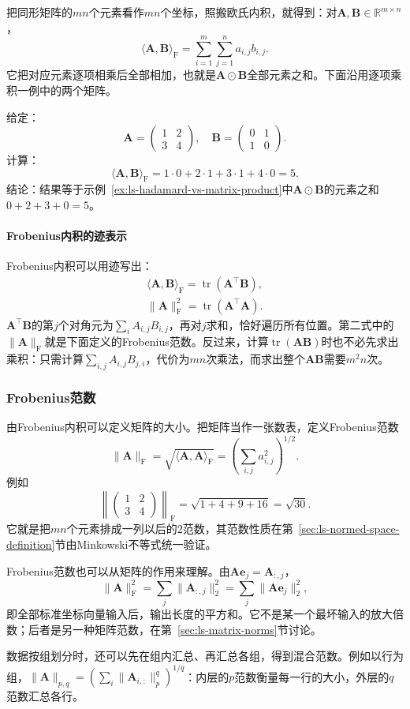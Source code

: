把同形矩阵的$mn$个元素看作$mn$个坐标，照搬欧氏内积，就得到：对$\bm A,\bm B\in\mathbb R^{m\times n}$，
\[
 \langle\bm A,\bm B\rangle_{\mathrm F}=\sum_{i=1}^m\sum_{j=1}^na_{i,j}b_{i,j}.
\]
它把对应元素逐项相乘后全部相加，也就是$\bm A\odot\bm B$全部元素之和。下面沿用逐项乘积一例中的两个矩阵。
\begin{example}[Frobenius内积的计算]
\label{ex:ls-frobenius-inner-product}
给定：
\[
 \bm A=\begin{pmatrix}1&2\\3&4\end{pmatrix},\quad
 \bm B=\begin{pmatrix}0&1\\1&0\end{pmatrix}.
\]
计算：
\[
 \langle\bm A,\bm B\rangle_{\mathrm F}=1\cdot0+2\cdot1+3\cdot1+4\cdot0=5.
\]
结论：结果等于示例~\ref{ex:ls-hadamard-vs-matrix-product}中$\bm A\odot\bm B$的元素之和$0+2+3+0=5$。
\end{example}

\paragraph{Frobenius内积的迹表示}
Frobenius内积可以用迹写出：
\[
 \begin{gathered}
 \langle\bm A,\bm B\rangle_{\mathrm F}=\operatorname{tr}(\bm A^\top\bm B),\\
 \lVert\bm A\rVert_{\mathrm F}^2=\operatorname{tr}(\bm A^\top\bm A).
 \end{gathered}
\]
$\bm A^\top\bm B$的第$j$个对角元为$\sum_i A_{i,j}B_{i,j}$，再对$j$求和，恰好遍历所有位置。第二式中的$\lVert\bm A\rVert_{\mathrm F}$就是下面定义的Frobenius范数。反过来，计算$\operatorname{tr}(\bm A\bm B)$时也不必先求出乘积：只需计算$\sum_{i,j}A_{i,j}B_{j,i}$，代价为$mn$次乘法，而求出整个$\bm A\bm B$需要$m^2n$次。

\subsubsection{Frobenius范数}
\label{sec:ls-frobenius-norm}

由Frobenius内积可以定义矩阵的大小。把矩阵当作一张数表，定义Frobenius范数
\[
 \lVert\bm A\rVert_{\mathrm F}=\sqrt{\langle\bm A,\bm A\rangle_{\mathrm F}}=\left(\sum_{i,j}a_{i,j}^2\right)^{1/2}.
\]
例如
\[
 \left\lVert\begin{pmatrix}1&2\\3&4\end{pmatrix}\right\rVert_{\mathrm F}=\sqrt{1+4+9+16}=\sqrt{30}.
\]
它就是把$mn$个元素排成一列以后的$2$范数，其范数性质在第~\ref{sec:ls-normed-space-definition}节由Minkowski不等式统一验证。

Frobenius范数也可以从矩阵的作用来理解。由$\bm A\bm e_j=\bm A_{:,j}$，
\[
 \lVert\bm A\rVert_{\mathrm F}^2=\sum_j\lVert\bm A_{:,j}\rVert_2^2=\sum_j\lVert\bm A\bm e_j\rVert_2^2,
\]
即全部标准坐标向量输入后，输出长度的平方和。它不是某一个最坏输入的放大倍数；后者是另一种矩阵范数，在第~\ref{sec:ls-matrix-norms}节讨论。

数据按组划分时，还可以先在组内汇总、再汇总各组，得到混合范数。例如以行为组，$\lVert\bm A\rVert_{p,q}=(\sum_i\lVert\bm A_{i,:}\rVert_p^q)^{1/q}$：内层的$p$范数衡量每一行的大小，外层的$q$范数汇总各行。
